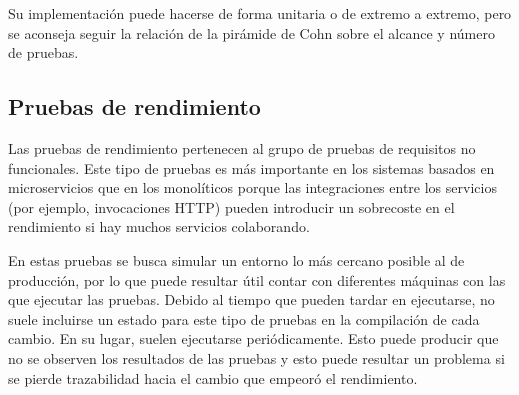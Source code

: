 \documentclass[11pt,a4paper]{article}
\begin{document}
Su implementación puede hacerse de forma unitaria o de extremo a extremo, pero se aconseja seguir la relación de la pirámide de Cohn sobre el alcance y número de pruebas.

\subsection{Pruebas de rendimiento}

Las pruebas de rendimiento pertenecen al grupo de pruebas de requisitos no funcionales. Este tipo de pruebas es más importante en los sistemas basados en microservicios que en los monolíticos porque las integraciones entre los servicios (por ejemplo, invocaciones HTTP) pueden introducir un sobrecoste en el rendimiento si hay muchos servicios colaborando.

En estas pruebas se busca simular un entorno lo más cercano posible al de producción, por lo que puede resultar útil contar con diferentes máquinas con las que ejecutar las pruebas. Debido al tiempo que pueden tardar en ejecutarse, no suele incluirse un estado para este tipo de pruebas en la compilación de cada cambio. En su lugar, suelen ejecutarse periódicamente. Esto puede producir que no se observen los resultados de las pruebas y esto puede resultar un problema si se pierde trazabilidad hacia el cambio que empeoró el rendimiento.
\end{document}
